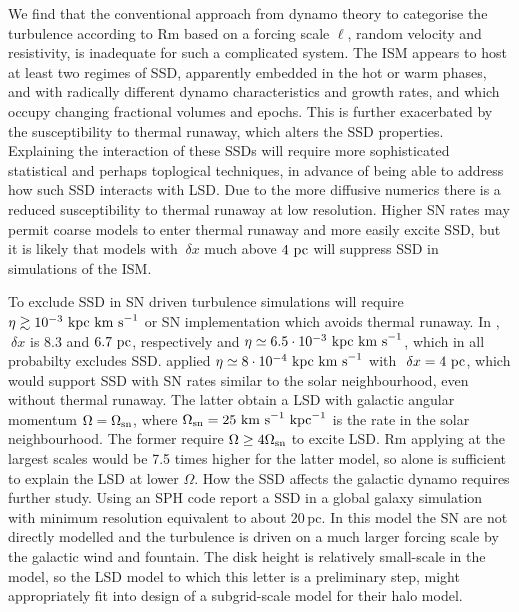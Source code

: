 \documentclass[preprint2]{aastex63}
\newcommand\OSN{\Omega_{\rm sn}}
\newcommand\kpc{~ {\rm kpc}}
\newcommand\pc{~ {\rm pc}}
\newcommand\dx{~ {\delta x}}
\newcommand\kms{~ {\rm km~ s}^{-1}}
\begin{document}
We find that the conventional approach from dynamo theory to categorise the 
turbulence according to Rm based on a forcing scale $\ell$, random velocity and
resistivity, is inadequate for such a complicated system.
The ISM appears to host at least two regimes of SSD, apparently
embedded in the hot or warm phases, and with radically different 
dynamo characteristics and growth rates, and which occupy changing fractional
volumes and epochs.
This is further exacerbated by the susceptibility to thermal runaway, which 
alters the SSD properties.
Explaining the interaction of these SSDs will require more sophisticated
statistical and perhaps toplogical techniques, in advance of being able to 
address how such SSD interacts with LSD.
Due to the more diffusive numerics there is a reduced susceptibility to
thermal runaway at low resolution. 
Higher SN rates may permit coarse models to enter thermal
runaway and more easily excite SSD, but it is likely that models with 
$\dx$ much above $4\pc$ will suppress SSD in simulations of the ISM.

To exclude SSD in SN driven turbulence simulations will require
$\eta\gtrsim10^{-3}\kpc\kms$ or SN implementation which avoids thermal runaway.
In \citet{Gressel:2008,GE20}, $\dx$ is 8.3 and $6.7\pc$, respectively
and $\eta\simeq6.5\cdot10^{-3}\kpc\kms$, which in all probabilty excludes SSD.
\citet{Gent:2013b} applied $\eta\simeq8\cdot10^{-4}\kpc\kms$ with $\dx=4\pc$,
which would support SSD with SN rates similar to the solar neighbourhood, even
without thermal runaway.
The latter obtain a LSD with galactic angular momentum $\Omega=\OSN$, where
$\OSN=25\kms\kpc^{-1}$ is the rate in the solar neighbourhood.
The former require $\Omega\geq4\OSN$ to excite LSD.
Rm applying at the largest scales would be 7.5 times higher for the latter 
model, so alone is sufficient to explain the LSD at lower $\Omega$.
How the SSD affects the galactic dynamo requires further study.
Using an SPH code \citet{SBADMN19} report a SSD in a global galaxy simulation
with minimum resolution equivalent to about 20\,pc.
In this model the SN are not directly modelled and the turbulence is driven
on a much larger forcing scale by the galactic wind and fountain.
The disk height is relatively small-scale in the model, so the LSD model
to which this letter is a preliminary step, might appropriately fit into
design of a subgrid-scale model for their halo model.
%
\end{document}
